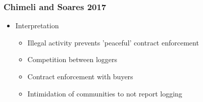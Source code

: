 \documentclass[xcolor=x11names,compress]{beamer}\usepackage[]{graphicx}\usepackage[]{color}
\renewcommand{\(}{\begin{columns}}
\renewcommand{\)}{\end{columns}}
\newcommand{\<}[1]{\begin{column}{#1}}
\renewcommand{\>}{\end{column}}
\begin{document}
\begin{frame}
\frametitle{Chimeli and Soares 2017}
\begin{itemize}
\item Interpretation
\begin{itemize}
\item Illegal activity prevents 'peaceful' contract enforcement
\item Competition between loggers
\item Contract enforcement with buyers
\item Intimidation of communities to not report logging
\end{itemize}
\end{itemize}
\end{frame}
\end{document}
